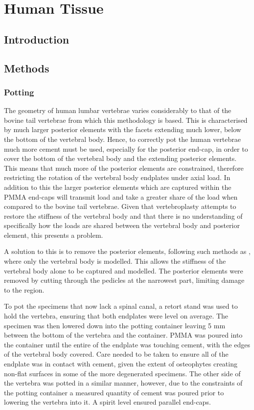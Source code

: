 \chapter{Human Tissue}

\section{Introduction}


\section{Methods}

\subsection{Potting}

The geometry of human lumbar vertebrae varies considerably to that of the bovine
tail vertebrae from which this methodology is based. This is characterised by
much larger posterior elements with the facets extending much lower, below the
bottom of the vertebral body. Hence, to correctly pot the human vertebrae much
more cement must be used, especially for the posterior end-cap, in order to
cover the bottom of the vertebral body and the extending posterior elements.
This means that much more of the posterior elements are constrained, therefore
restricting the rotation of the vertebral body endplates under axial load. In
addition to this the larger posterior elements which are captured within the
PMMA end-caps will transmit load and take a greater share of the load when
compared to the bovine tail vertebrae. Given that vertebroplasty attempts to
restore the stiffness of the vertebral body and that there is no understanding
of specifically how the loads are shared between the vertebral body and
posterior element, this presents a problem.

A solution to this is to remove the posterior elements, following such methods
as \cite{Wijayathunga2008,RobsonBrown2014}, where only the vertebral body is
modelled. This allows the stiffness of the vertebral body alone to be captured
and modelled. The posterior elements were removed by cutting through the
pedicles at the narrowest part, limiting damage to the region.

To pot the specimens that now lack a spinal canal, a retort stand was used to
hold the vertebra, ensuring that both endplates were level on average. The
specimen was then lowered down into the potting container leaving 5 mm between
the bottom of the vertebra and the container. PMMA was poured into the container
until the entire of the endplate was touching cement, with the edges of the
vertebral body covered. Care needed to be taken to ensure all of the endplate
was in contact with cement, given the extent of osteophytes creating non-flat
surfaces in some of the more degenerated specimens. The other side of the
vertebra was potted in a similar manner, however, due to the constraints of the
potting container a measured quantity of cement was poured prior to lowering the
vertebra into it. A spirit level ensured parallel end-caps.

